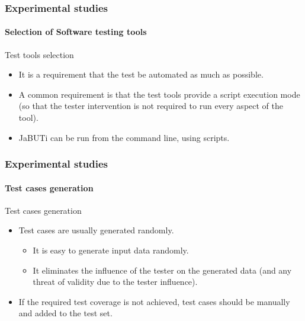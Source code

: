 \begin{frame}
\frametitle{Experimental studies}
\framesubtitle{Selection of Software testing tools}

\begin{block:fact}{Test tools selection}
\begin{itemize}
	\item It is a requirement that the test be automated as much as possible.

	\item A common requirement is that the test tools provide a script
	execution mode (so that the tester intervention is not required to run
	every aspect of the tool).

	\item JaBUTi can be run from the command line, using scripts.
\end{itemize}
\end{block:fact}
\end{frame}



\begin{frame}
\frametitle{Experimental studies}
\framesubtitle{Test cases generation}

\begin{block:fact}{Test cases generation}
\begin{itemize}
	\item Test cases are usually generated randomly.
	\begin{itemize}
		\item It is easy to generate input data randomly.
		\item It eliminates the influence of the tester on the generated data
		(and any threat of validity due to the tester influence).
	\end{itemize}

	\item If the required test coverage is not achieved, test cases should
	be manually and added to the test set.
\end{itemize}
\end{block:fact}
\end{frame}



